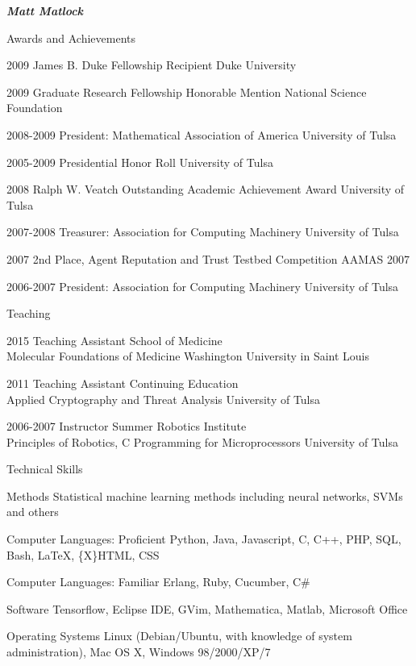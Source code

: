 \documentclass[10pt]{article}
\makeatletter
\newcommand\footnoteref[1]{\protected@xdef\@thefnmark{\ref{#1}}\@footnotemark}
\makeatother
\begin{document}
\begin{cv}{\huge \it \bfseries Matt Matlock}
\begin{cvlist}{Awards and Achievements}
\item[2009] James B. Duke Fellowship Recipient \hfill Duke University
\item[2009] Graduate Research Fellowship Honorable Mention \hfill National Science Foundation 
\item[2008-2009] President: Mathematical Association of America \hfill University of Tulsa
\item[2005-2009] Presidential Honor Roll \hfill University of Tulsa
\item[2008] Ralph W. Veatch Outstanding Academic Achievement Award \hfill University of Tulsa
\item[2007-2008] Treasurer: Association for Computing Machinery \hfill University of Tulsa
\item[2007] 2nd Place, Agent Reputation and Trust Testbed Competition \hfill AAMAS 2007\footnoteref{AAMASfoot}
\item[2006-2007] President: Association for Computing Machinery \hfill University of Tulsa
\end{cvlist}

\begin{cvlist}{Teaching}
\item[2015] Teaching Assistant \hfill School of Medicine \\ Molecular Foundations of Medicine \hfill Washington University in Saint Louis
\item[2011] Teaching Assistant \hfill Continuing Education \\ Applied Cryptography and Threat Analysis \hfill University of Tulsa
\item[2006-2007] Instructor \hfill Summer Robotics Institute \\ Principles of Robotics, C Programming for Microprocessors \hfill University of Tulsa
\end{cvlist}

\begin{cvlist}{Technical Skills}
\item[Methods] Statistical machine learning methods including neural networks, SVMs and others
\item[Computer Languages: Proficient] Python, Java, Javascript, C, C++, PHP, SQL, Bash, \LaTeX, \{X\}HTML, CSS
\item[Computer Languages: Familiar] Erlang, Ruby, Cucumber, C\#
\item[Software] Tensorflow, Eclipse IDE, GVim, Mathematica, Matlab, Microsoft Office
\item[Operating Systems] Linux (Debian/Ubuntu, with knowledge of system administration), Mac OS X, Windows 98/2000/XP/7
\end{cvlist}


\end{cv}
\end{document}
